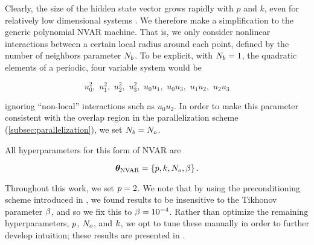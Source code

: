 Clearly, the size of the hidden state vector grows rapidly with $p$ and $k$,
even for relatively low dimensional systems .
We therefore make a simplification to the generic polynomial NVAR machine.
That is, we only consider nonlinear interactions between a certain local radius
around each point, defined by the number of neighbors parameter $N_{b}$.
To be explicit, with $N_{b}=1$, the quadratic elements of a periodic, four variable
system would be
\begin{linenomath*}\begin{equation*}
    u_0^2, \,\, u_1^2, \,\, u_2^2, \,\, u_3^2, \,\,
    u_0u_1, \,\, u_0u_3, \,\, u_1u_2, \,\, u_2u_3
\end{equation*}\end{linenomath*}
ignoring ``non-local'' interactions such as $u_0u_2$.
In order to make this parameter consistent with the overlap region in the
parallelization scheme (\cref{subsec:parallelization}),
we set $N_{b} = N_{o}$.

All hyperparameters for this form of NVAR are
\begin{linenomath*}\begin{equation*}
    \bm{\theta}_\text{NVAR} =
    \{ p, k, N_{o}, \beta \} \, .
\end{equation*}\end{linenomath*}
Throughout this work, we set $p = 2$.
We note that by using the preconditioning scheme introduced in ,
we found results to be insensitive to the Tikhonov parameter $\beta$, and so
we fix this to $\beta = 10^{-4}$.
Rather than optimize the remaining hyperparameters,
$p$, $N_{o}$, and $k$, we opt to tune
these manually in order to further develop intuition; these results are
presented in .

